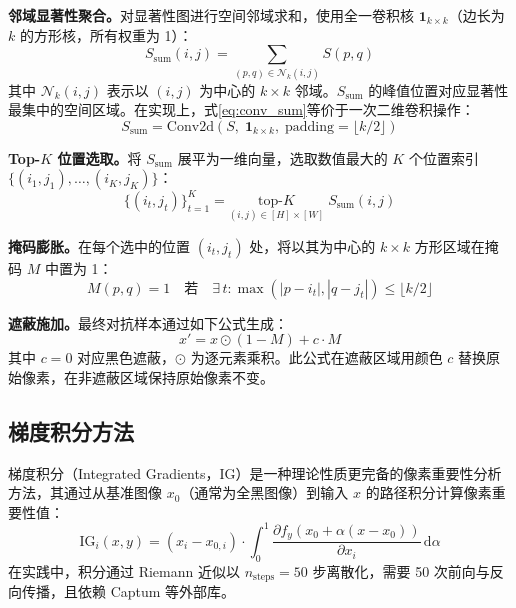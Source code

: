 \textbf{邻域显著性聚合。}对显著性图进行空间邻域求和，使用全一卷积核 $\mathbf{1}_{k \times k}$（边长为 $k$ 的方形核，所有权重为 1）：
\begin{equation}
  S_{\text{sum}}(i,j) = \sum_{(p,q) \in \mathcal{N}_k(i,j)} S(p,q)
  \label{eq:conv_sum}
\end{equation}
其中 $\mathcal{N}_k(i,j)$ 表示以 $(i,j)$ 为中心的 $k \times k$ 邻域。$S_{\text{sum}}$ 的峰值位置对应显著性最集中的空间区域。在实现上，式\eqref{eq:conv_sum}等价于一次二维卷积操作：
\begin{equation}
  S_{\text{sum}} = \text{Conv2d}\!\left(S,\; \mathbf{1}_{k \times k},\; \text{padding}=\lfloor k/2 \rfloor\right)
\end{equation}

\textbf{Top-$K$ 位置选取。}将 $S_{\text{sum}}$ 展平为一维向量，选取数值最大的 $K$ 个位置索引 $\{(i_1,j_1), \ldots, (i_K,j_K)\}$：
\begin{equation}
  \{(i_t, j_t)\}_{t=1}^{K} = \underset{(i,j) \in [H]\times[W]}{\mathrm{top}\text{-}K}\; S_{\text{sum}}(i,j)
\end{equation}

\textbf{掩码膨胀。}在每个选中的位置 $(i_t, j_t)$ 处，将以其为中心的 $k \times k$ 方形区域在掩码 $M$ 中置为 1：
\begin{equation}
  M(p,q) = 1 \quad \text{若} \quad \exists\, t: \max(|p - i_t|, |q - j_t|) \leq \lfloor k/2 \rfloor
\end{equation}

\textbf{遮蔽施加。}最终对抗样本通过如下公式生成：
\begin{equation}
  x' = x \odot (1 - M) + c \cdot M
  \label{eq:occlusion}
\end{equation}
其中 $c=0$ 对应黑色遮蔽，$\odot$ 为逐元素乘积。此公式在遮蔽区域用颜色 $c$ 替换原始像素，在非遮蔽区域保持原始像素不变。

\subsection{梯度积分方法}

梯度积分（Integrated Gradients，IG）\cite{sundararajan2017ig}是一种理论性质更完备的像素重要性分析方法，其通过从基准图像 $x_0$（通常为全黑图像）到输入 $x$ 的路径积分计算像素重要性值：
\begin{equation}
  \text{IG}_i(x, y) = (x_i - x_{0,i}) \cdot \int_0^1 \frac{\partial f_y(x_0 + \alpha(x - x_0))}{\partial x_i} \,\mathrm{d}\alpha
\end{equation}
在实践中，积分通过 Riemann 近似以 $n_{\text{steps}}=50$ 步离散化，需要 50 次前向与反向传播，且依赖 Captum 等外部库。







